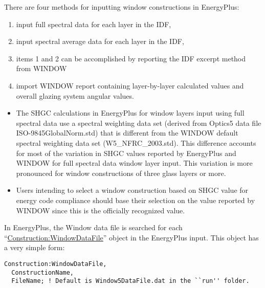 There are four methods for inputting window constructions in EnergyPlus:

\begin{enumerate}
\tightlist
\item
  input full spectral data for each layer in the IDF,
\item
  input spectral average data for each layer in the IDF,
\item
  items 1 and 2 can be accomplished by reporting the IDF excerpt method from WINDOW
\item
  import WINDOW report containing layer-by-layer calculated values and overall glazing system angular values.
\end{enumerate}

\begin{callout}
\end{callout}

\begin{itemize}
\item
  The SHGC calculations in EnergyPlus for window layers input using full spectral data use a spectral weighting data set (derived from Optics5 data file ISO-9845GlobalNorm.std) that is different from the WINDOW default spectral weighting data set (W5\_NFRC\_2003.std). This difference accounts for most of the variation in SHGC values reported by EnergyPlus and WINDOW for full spectral data window layer input. This variation is more pronounced for window constructions of three glass layers or more.
\item
  Users intending to select a window construction based on SHGC value for energy code compliance should base their selection on the value reported by WINDOW since this is the officially recognized value.
\end{itemize}

In EnergyPlus, the Window data file is searched for each ``\hyperref[constructionwindowdatafile]{Construction:WindowDataFile}'' object in the EnergyPlus input. This object has a very simple form:

\begin{lstlisting}
Construction:WindowDataFile,
  ConstructionName,
  FileName; ! Default is Window5DataFile.dat in the ``run'' folder.
\end{lstlisting}

